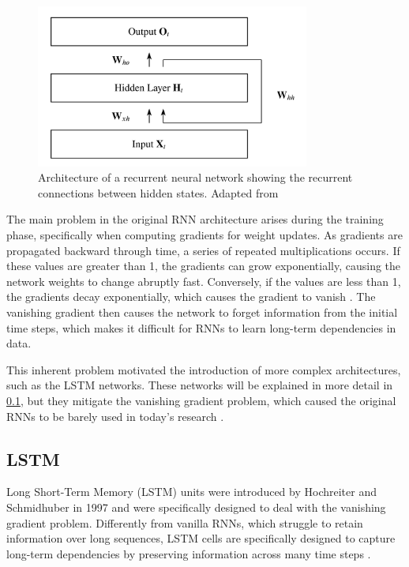 \begin{figure}[H]
    \centering
    \includegraphics[width=9cm]{Cap2_LitReview/model_basics/RNN/rnn.png}
    \caption{Architecture of a recurrent neural network showing the recurrent connections between hidden states. Adapted from \cite{schmidt2019recurrentneuralnetworksrnns}}
    \label{fig:RNN-struct}
\end{figure}

The main problem in the original RNN architecture arises during the training phase, specifically when computing gradients for weight updates. As gradients are propagated backward through time, a series of repeated multiplications occurs. If these values are greater than 1, the gradients can grow exponentially, causing the network weights to change abruptly fast. Conversely, if the values are less than 1, the gradients decay exponentially, which causes the gradient to vanish \cite{kolen,pmlr-v9-glorot10a}. The vanishing gradient then causes the network to forget information from the initial time steps, which makes it difficult for RNNs to learn long-term dependencies in data.

This inherent problem motivated the introduction of more complex architectures, such as the LSTM networks. These networks will be explained in more detail in \ref{sec-LSTM}, but they mitigate the vanishing gradient problem, which caused the original RNNs to be barely used in today's research \cite{fang-wei,GAO2019279}.

\subsection{LSTM} \label{sec-LSTM}

Long Short-Term Memory (LSTM) units were introduced by Hochreiter and Schmidhuber in 1997 \cite{Hochreiter} and were specifically designed to deal with the vanishing gradient problem. Differently from vanilla RNNs, which struggle to retain information over long sequences, LSTM cells are specifically designed to capture long-term dependencies by preserving information across many time steps \cite{ALSELWI2024102068,schmidt2019recurrentneuralnetworksrnns}.

